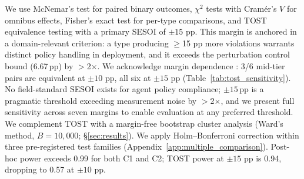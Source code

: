 We use McNemar's test for paired binary outcomes, $\chi^2$ tests with Cram\'{e}r's $V$ for omnibus effects, Fisher's exact test for per-type comparisons, and TOST equivalence testing \citep{lakens_2017} with a primary SESOI of $\pm 15$ pp. This margin is anchored in a domain-relevant criterion: a type producing $\geq$15 pp more violations warrants distinct policy handling in deployment, and it exceeds the perturbation control bound (6.67\,pp) by $>$2$\times$. We acknowledge margin dependence \citep{anvari_lakens_2021}: 3/6 mid-tier pairs are equivalent at $\pm 10$ pp, all six at $\pm 15$ pp (Table~\ref{tab:tost_sensitivity}). No field-standard SESOI exists for agent policy compliance; $\pm 15$\,pp is a pragmatic threshold exceeding measurement noise by $>$2$\times$, and we present full sensitivity across seven margins to enable evaluation at any preferred threshold. We complement TOST with a margin-free bootstrap cluster analysis (Ward's method, $B = 10{,}000$; \S\ref{sec:results}). We apply Holm--Bonferroni correction within three pre-registered test families (Appendix~\ref{app:multiple_comparison}). Post-hoc power exceeds 0.99 for both C1 and C2; TOST power at $\pm 15$ pp is 0.94, dropping to 0.57 at $\pm 10$ pp.
